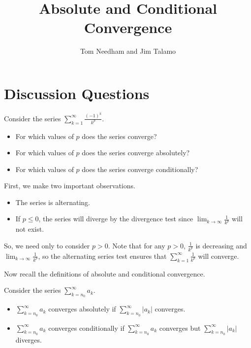 \documentclass[noauthor]{ximera}
\author{Tom Needham and Jim Talamo}
\title[Collaborate:]{Absolute and Conditional Convergence}
\begin{document}
\begin{abstract}
\end{abstract}
\maketitle

\section{Discussion Questions}

\begin{problem}
Consider the series $\sum_{k=1}^{\infty} \frac{(-1)^k}{k^p}$. 

\begin{itemize}
\item For which values of $p$ does the series converge? 
\item For which values of $p$ does the series converge absolutely? 
\item For which values of $p$ does the series converge conditionally? 
\end{itemize}

\begin{freeResponse}
First, we make two important observations.

\begin{itemize}
\item The series is alternating.
\item If $p \leq 0$, the series will diverge by the divergence test since $\lim_{k \to \infty} \frac{1}{k^p}$ will not exist.
\end{itemize}

So, we need only to consider $p>0$.  Note that for any $p>0$, $\frac{1}{k^p}$ is decreasing and $\lim_{k \to \infty} \frac{1}{k^p}$, so the alternating series test ensures that $\sum_{k=1}^{\infty} \frac{1}{k^p}$ will converge.  

Now recall the definitions of absolute and conditional convergence.

\begin{definition}
Consider the series $\sum_{k=n_0}^{\infty} a_k$. 

\begin{itemize}
\item $\sum_{k=n_0}^{\infty} a_k$ converges absolutely if $\sum_{k=n_0}^{\infty} \left|a_k\right|$ converges.
\item $\sum_{k=n_0}^{\infty} a_k$ converges conditionally if $\sum_{k=n_0}^{\infty} a_k$ converges but $\sum_{k=n_0}^{\infty} \left|a_k\right|$ diverges.
\end{itemize}
\end{definition}


\end{freeResponse}
\end{problem}
\end{document}
